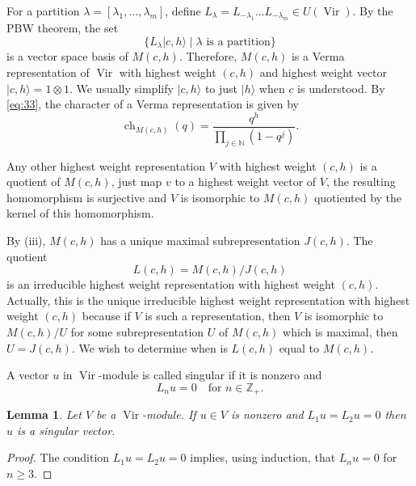 \documentclass[a4paper, 12pt, reqno]{amsart}
\newtheorem{lemma}[theorem]{Lemma}
\theoremstyle{remark}
\numberwithin{equation}{subsection}
\DeclareMathOperator{\Vir}{Vir}
\DeclareMathOperator{\ch}{ch}
\begin{document}
For a partition $\lambda = [\lambda_1, \dots, \lambda_m]$, define $L_{\lambda} = L_{-\lambda_1}\dots L_{-\lambda_m} \in U(\Vir)$.
By the PBW theorem, the set
\begin{equation*}
  \{L_\lambda|c,h\rangle \mid \lambda\text{ is a partition}\}
\end{equation*}
is a vector space basis of $M(c, h)$.
Therefore, $M(c, h)$ is a Verma representation of $\Vir$ with highest weight $(c, h)$ and highest weight vector $|c, h\rangle = 1\otimes1$.
We usually simplify $|c, h\rangle$ to just $|h\rangle$ when $c$ is understood.
By \eqref{eq:33}, the character of a Verma representation is given by
\begin{equation*}
  \ch_{M(c, h)}(q) = \frac{q^h}{\prod_{j \in \mathbb{N}}(1 - q^j)}.
\end{equation*}

Any other highest weight representation $V$ with highest weight $(c, h)$ is a quotient of $M(c, h)$, just map $v$ to a highest weight vector of $V$, the resulting homomorphism is surjective and $V$ is isomorphic to $M(c, h)$ quotiented by the kernel of this homomorphism.

By (iii), $M(c, h)$ has a unique maximal subrepresentation $J(c, h)$.
The quotient
\begin{equation*}
  L(c, h) = M(c, h)/J(c, h)
\end{equation*}
is an irreducible highest weight representation with highest weight $(c, h)$.
Actually, this is the unique irreducible highest weight representation with highest weight $(c, h)$ because if $V$ is such a representation, then $V$ is isomorphic to $M(c, h)/U$ for some subrepresentation $U$ of $M(c, h)$ which is maximal, then $U = J(c, h)$.
We wish to determine when is $L(c, h)$ equal to $M(c, h)$.

A vector $u$ in $\Vir$-module is called singular if it is nonzero and
\begin{equation}
  \label{eq:34}
  L_nu = 0 \quad \text{for }n \in \mathbb{Z}_+.
\end{equation}

\begin{lemma}
  \label{lmm:15}
  Let $V$ be a $\Vir$-module.
  If $u \in V$ is nonzero and $L_1u = L_2u = 0$ then $u$ is a singular vector. 
\end{lemma}

\begin{proof}
  The condition $L_1u = L_2u = 0$ implies, using induction, that $L_nu = 0$ for $n \ge 3$.
\end{proof}
\end{document}
